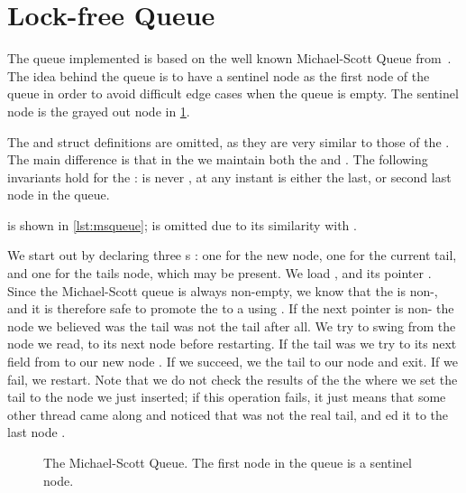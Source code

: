 \section{Lock-free Queue\label{sec:usage-queue}}


The queue implemented is based on the well known Michael-Scott Queue from~\cite{michael1996simple}.
The idea behind the queue is to have a sentinel node as the first node of the queue in order to
avoid difficult edge cases when the queue is empty. The sentinel node is the grayed out node in
\cref{fig:msqueue}.

The  and  struct definitions are omitted, as they are very similar to
those of the . The main difference is that in the  we maintain both the
 and . The following invariants hold for the :  is
never , at any instant  is either the last, or second last node in the
queue.

 is shown in \cref{lst:msqueue};  is omitted due
to its similarity with .

\begin{figure}[ht]

\end{figure}

We start out by declaring three s : one for the new node, one for the
current tail, and one for the tails  node, which may be present.  We load 
, and its  pointer .  Since the Michael-Scott queue is always
non-empty, we know that the  is non-, and it is therefore safe to promote the
 to a  using .  If the next pointer is non-
the node we believed was the tail was not the tail after all. We try to swing  from the
node we read, to its next node  before restarting.  If the tail was  we try
to  its next field from  to our new node . If we succeed, we
 the tail to our node and exit. If we fail, we restart.  Note that we do not check the
results of the the  where we set the tail to the node we just inserted; if this operation
fails, it just means that some other thread came along and noticed that  was not the
real tail, and ed it to the last node .

\begin{figure}[ht]
\centering

  \caption{The Michael-Scott Queue. The first node in the queue is a sentinel
  node.\label{fig:msqueue}}
\end{figure}



